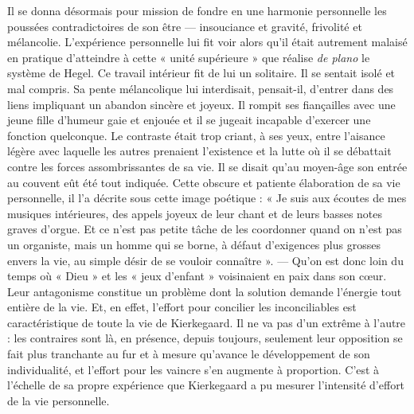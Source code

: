 \documentclass[12pt,a4paper]{article}
\newcommand{\opage}[1]{\marginnote{\footnotesize\textit{[#1]}}}
\begin{document}
Il se donna désormais pour mission de fondre en une harmonie
personnelle les poussées contradictoires de son être --- insouciance
et gravité, frivolité et mélancolie. L'expérience personnelle lui fit
voir alors qu'il était autrement malaisé en pratique d'atteindre à
cette « unité supérieure » que réalise \emph{de plano} le système de Hegel.
Ce travail intérieur fit de lui un solitaire. Il se sentait isolé et mal
compris. Sa pente mélancolique lui interdisait, pensait-il, d'entrer
dans des liens impliquant un abandon sincère et joyeux. Il rompit
ses fiançailles avec une jeune fille d'humeur gaie et enjouée et il se
jugeait incapable d'exercer une fonction quelconque. Le contraste
était trop criant, à ses yeux, entre l'aisance légère avec laquelle les
autres prenaient l'existence et la lutte où il se débattait contre les
forces assombrissantes de sa vie. Il se disait qu'au moyen-âge son
entrée au couvent eût été tout indiquée. Cette obscure et patiente
élaboration de sa vie personnelle, il l'a décrite sous cette image
poétique : « Je suis aux écoutes de mes musiques intérieures, des
appels joyeux de leur chant et de leurs basses notes graves d'orgue.
Et ce n'est pas petite tâche de les coordonner quand on n'est pas un
organiste, mais un homme qui se borne, à défaut d'exigences plus
\opage{228} grosses envers la vie, au simple désir de se vouloir connaître ». ---
Qu'on est donc loin du temps où « Dieu » et les « jeux d'enfant »
voisinaient en paix dans son cœur. Leur antagonisme constitue un
problème dont la solution demande l'énergie tout entière de la vie.
Et, en effet, l'effort pour concilier les inconciliables est caractéristique
de toute la vie de Kierkegaard. Il ne va pas d'un extrême à
l'autre : les contraires sont là, en présence, depuis toujours, seulement
leur opposition se fait plus tranchante au fur et à mesure
qu'avance le développement de son individualité, et l'effort pour les
vaincre s'en augmente à proportion. C'est à l'échelle de sa propre
expérience que Kierkegaard a pu mesurer l'intensité d'effort de la
vie personnelle.
\end{document}
